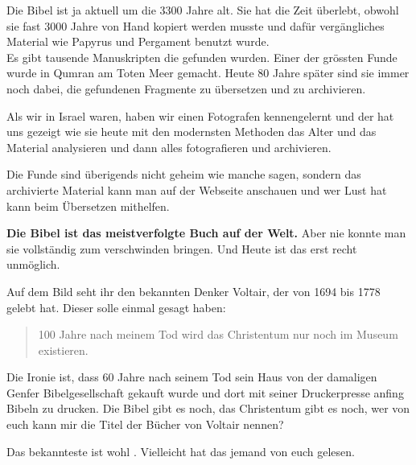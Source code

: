 \documentclass[fontsize=16pt]{mybib}
\begin{document}
\begin{otsblock}
Die Bibel ist ja aktuell um die 3300 Jahre alt. Sie hat die Zeit überlebt, obwohl sie fast 3000 Jahre von Hand kopiert werden musste und dafür vergängliches Material wie Papyrus und Pergament benutzt wurde.\\
Es gibt tausende Manuskripten die gefunden wurden. Einer der grössten Funde wurde in Qumran am Toten Meer gemacht. Heute 80 Jahre später sind sie immer noch dabei, die gefundenen Fragmente zu übersetzen und zu archivieren. 

Als wir in Israel waren, haben wir einen Fotografen kennengelernt und der hat uns gezeigt wie sie heute mit den modernsten Methoden das Alter und das Material analysieren und dann alles fotografieren und archivieren.

Die Funde sind überigends nicht geheim wie manche sagen, sondern das archivierte Material kann man auf der Webseite anschauen und wer Lust hat kann beim Übersetzen mithelfen.
\end{otsblock}
\begin{otsblock}
    \textbf{Die Bibel ist das meistverfolgte Buch auf der Welt. }Aber nie konnte man sie vollständig zum verschwinden bringen. Und Heute ist das erst recht unmöglich.

    Auf dem Bild seht ihr den bekannten Denker Voltair, der von 1694 bis 1778 gelebt hat. Dieser solle einmal gesagt haben:
    \begin{quote}
        100 Jahre nach meinem Tod wird das Christentum nur noch im Museum existieren.
    \end{quote}
    Die Ironie ist, dass 60 Jahre nach seinem Tod sein Haus von der damaligen Genfer Bibelgesellschaft gekauft wurde und dort mit seiner Druckerpresse anfing Bibeln zu drucken. Die Bibel gibt es noch, das Christentum gibt es noch, wer von euch kann mir die Titel der Bücher von Voltair nennen?
    
    Das bekannteste ist wohl . Vielleicht hat das jemand von euch gelesen.

\end{otsblock}
\end{document}
